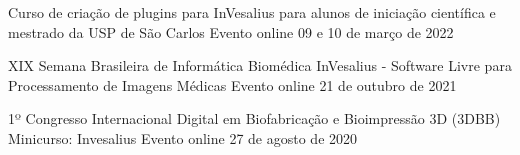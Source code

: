 \begin{cventries}

  \cventry
  {}
  {Curso de criação de plugins para InVesalius para alunos de iniciação científica e mestrado da USP de São Carlos}
  {Evento online}
  {09 e 10 de março de 2022}
  {}

  \cventry
  {XIX Semana Brasileira de Informática Biomédica}
  {InVesalius - Software Livre para Processamento de Imagens Médicas}
  {Evento online}
  {21 de outubro de 2021}
  {}

  \cventry
  {1º Congresso Internacional Digital em Biofabricação e Bioimpressão 3D (3DBB)}
  {Minicurso: Invesalius}
  {Evento online}
  {27 de agosto de 2020}
  {}




\end{cventries}

